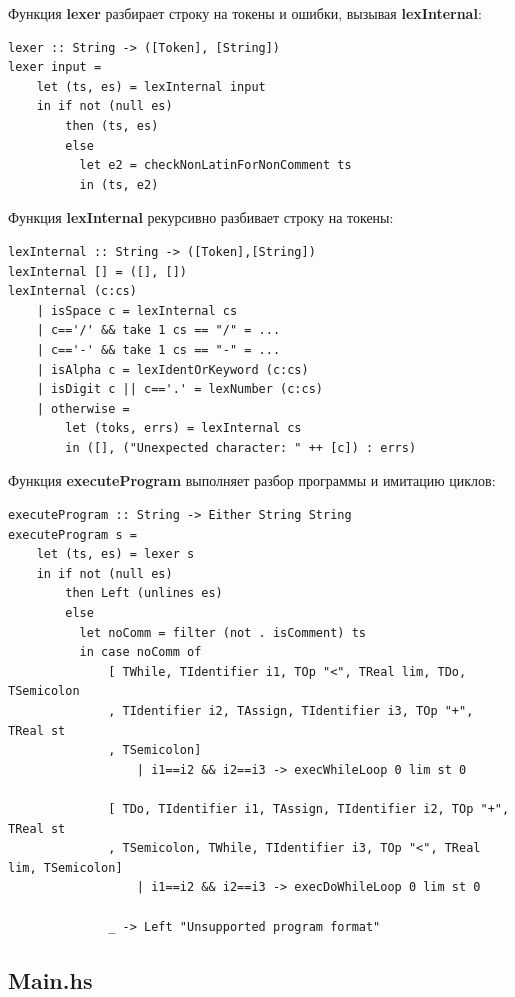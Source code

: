 \documentclass[areasetadvanced]{scrartcl}
\begin{document}
Функция \textbf{lexer} разбирает строку на токены и ошибки, вызывая \textbf{lexInternal}:
\begin{lstlisting}
lexer :: String -> ([Token], [String])
lexer input =
    let (ts, es) = lexInternal input
    in if not (null es)
        then (ts, es)
        else
          let e2 = checkNonLatinForNonComment ts
          in (ts, e2)
\end{lstlisting}

Функция \textbf{lexInternal} рекурсивно разбивает строку на токены:
\begin{lstlisting}
lexInternal :: String -> ([Token],[String])
lexInternal [] = ([], [])
lexInternal (c:cs)
    | isSpace c = lexInternal cs
    | c=='/' && take 1 cs == "/" = ...
    | c=='-' && take 1 cs == "-" = ...
    | isAlpha c = lexIdentOrKeyword (c:cs)
    | isDigit c || c=='.' = lexNumber (c:cs)
    | otherwise =
        let (toks, errs) = lexInternal cs
        in ([], ("Unexpected character: " ++ [c]) : errs)
\end{lstlisting}

Функция \textbf{executeProgram} выполняет разбор программы и имитацию циклов:
\begin{lstlisting}
executeProgram :: String -> Either String String
executeProgram s =
    let (ts, es) = lexer s
    in if not (null es)
        then Left (unlines es)
        else
          let noComm = filter (not . isComment) ts
          in case noComm of
              [ TWhile, TIdentifier i1, TOp "<", TReal lim, TDo, TSemicolon
              , TIdentifier i2, TAssign, TIdentifier i3, TOp "+", TReal st
              , TSemicolon]
                  | i1==i2 && i2==i3 -> execWhileLoop 0 lim st 0

              [ TDo, TIdentifier i1, TAssign, TIdentifier i2, TOp "+", TReal st
              , TSemicolon, TWhile, TIdentifier i3, TOp "<", TReal lim, TSemicolon]
                  | i1==i2 && i2==i3 -> execDoWhileLoop 0 lim st 0

              _ -> Left "Unsupported program format"
\end{lstlisting}
\newpage
\subsection{Main.hs}
\end{document}
